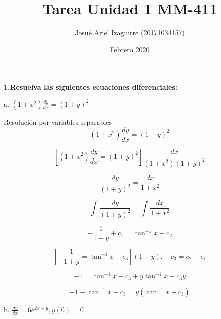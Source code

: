 \documentclass{article}
\title{Tarea Unidad 1 MM-411}
\author{Josué Ariel Izaguirre (20171034157)}
\date{Febrero 2020}
\begin{document}
    \maketitle
    \begin{flushleft}
        \textbf{1.Resuelva las siguientes ecuaciones diferenciales:} \break
        
        
        \hspace{10mm} a. $
            \left( 1+x^2 \right) \frac{dy}{dx} = \left(1+y \right)^2
            $  \break

            \hspace{10mm} Resolución por variables separables \break
                \[
                    \left( 1+x^2 \right) \frac{dy}{dx} = \left(1+y \right)^2
                \]

                \[
                   \left[ \left( 1+x^2 \right) \frac{dy}{dx} = \left(1+y \right)^2 \right] \frac{dx}{(1+x^2)(1+y)^2}
                \]

                \[
                   \frac{dy}{(1+y)^2} = \frac{dx}{1+x^2}
                \]

                \[
                   \int_{}^{} \frac{dy}{(1+y)^2} = \int_{}^{} \frac{dx}{1+x^2} 
                \]

                \[
                    -\frac{1}{1+y} + c_1 = \tan ^ {-1} {x} + c_2
                \]

                \[
                   \left[ -\frac{1}{1+y} = \tan ^ {-1} {x} + c_3 \right] (1+y)  ,\quad c_3 = c_2 - c_1
                \]

                \[
                    -1 = \tan ^ {-1} {x} + c_3 + y\tan ^ {-1} {x} + c_{3}y
                \]

                \[
                    -1 - \tan ^ {-1} {x} - c_3 = y \left( \tan ^ {-1} {x} + c_{3} \right)
                \]

        \hspace{10mm} b. $
            \frac{dy}{dx} = 6e^{2x-y} , y(0) = 0
            $  \break
    \end{flushleft}
\end{document}
